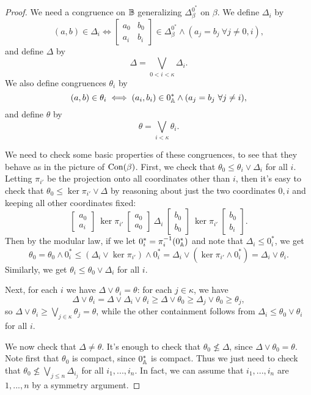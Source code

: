 \begin{appendices}
\begin{proof}
We need a congruence on $\mathbb{B}$ generalizing $\Delta_\beta^{0^*}$ on $\beta$. We define $\Delta_i$ by
\[
(a,b) \in \Delta_i \iff \begin{bmatrix} a_0 & b_0\\ a_i & b_i\end{bmatrix} \in \Delta_\beta^{0^*} \wedge (a_j = b_j\ \forall j \ne 0,i),
\]
and define $\Delta$ by
\[
\Delta = \bigvee_{0 < i < \kappa} \Delta_i.
\]
We also define congruences $\theta_i$ by
\[
(a,b) \in \theta_i \iff (a_i,b_i) \in 0_{\mathbb{A}}^* \wedge (a_j = b_j\ \forall j \ne i),
\]
and define $\theta$ by
\[
\theta = \bigvee_{i < \kappa} \theta_i.
\]

We need to check some basic properties of these congruences, to see that they behave as in the picture of $\operatorname{Con}(\beta)$. First, we check that $\theta_0 \le \theta_i \vee \Delta_i$ for all $i$. Letting $\pi_{i'}$ be the projection onto all coordinates other than $i$, then it's easy to check that $\theta_0 \le \ker \pi_{i'} \vee \Delta$ by reasoning about just the two coordinates $0,i$ and keeping all other coordinates fixed:
\[
\begin{bmatrix} a_0\\ a_i\end{bmatrix}\ \ker \pi_{i'}\ \begin{bmatrix} a_0\\ a_0\end{bmatrix}\ \Delta_i\ \begin{bmatrix} b_0\\ b_0\end{bmatrix}\ \ker \pi_{i'}\ \begin{bmatrix} b_0\\ b_i\end{bmatrix}.
\]
Then by the modular law, if we let $0^*_i = \pi_i^{-1}(0^*_{\mathbb{A}})$ and note that $\Delta_i \le 0^*_i$, we get
\[
\theta_0 = \theta_0 \wedge 0^*_i \le (\Delta_i \vee \ker \pi_{i'}) \wedge 0^*_i = \Delta_i \vee (\ker \pi_{i'} \wedge 0^*_i) = \Delta_i \vee \theta_i.
\]
Similarly, we get $\theta_i \le \theta_0 \vee \Delta_i$ for all $i$.

Next, for each $i$ we have $\Delta \vee \theta_i = \theta$: for each $j \in \kappa$, we have
\[
\Delta \vee \theta_i = \Delta \vee \Delta_i \vee \theta_i \ge \Delta \vee \theta_0 \ge \Delta_j \vee \theta_0 \ge \theta_j,
\]
so $\Delta \vee \theta_i \ge \bigvee_{j \in \kappa} \theta_j = \theta$, while the other containment follows from $\Delta_i \le \theta_0 \vee \theta_i$ for all $i$.

We now check that $\Delta \ne \theta$. It's enough to check that $\theta_0 \not\le \Delta$, since $\Delta \vee \theta_0 = \theta$. Note first that $\theta_0$ is compact, since $0^*_{\mathbb{A}}$ is compact. Thus we just need to check that $\theta_0 \not\le \bigvee_{j \le n} \Delta_{i_j}$ for all $i_1, ..., i_n$. In fact, we can assume that $i_1, ..., i_n$ are $1, ..., n$ by a symmetry argument.


\end{proof}
\end{appendices}
